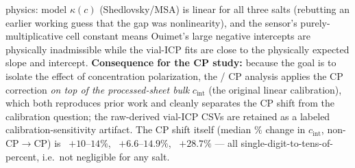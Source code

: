 \documentclass[11pt]{article}
\newcommand{\cint}{c_{\mathrm{int}}}
\begin{document}
physics: model $\kappa(c)$ (Shedlovsky/MSA) is linear for all three salts
(rebutting an earlier working guess that the gap was nonlinearity), and the
sensor's purely-multiplicative cell constant means Ouimet's large negative
intercepts are physically inadmissible while the vial-ICP fits are close to
the physically expected slope and intercept.
\textbf{Consequence for the CP study:} because the goal is to isolate the
effect of concentration polarization, the / CP analysis
applies the CP correction \emph{on top of the processed-sheet bulk}
$\cint$ (the original linear calibration), which both reproduces prior work and
cleanly separates the CP shift from the calibration question; the raw-derived
vial-ICP CSVs are retained as a labeled calibration-sensitivity artifact. The CP
shift itself (median $\%$ change in $\cint$, non-CP$\to$CP) is
~$+10$--$14\%$, ~$+6.6$--$14.9\%$, ~$+28.7\%$ ---
all single-digit-to-tens-of-percent, i.e.\ not negligible for any salt.
\end{document}
